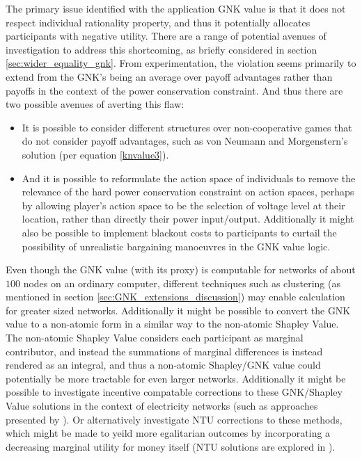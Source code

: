 The primary issue identified with the application GNK value is that it does not respect individual rationality property, and thus it potentially allocates participants with negative utility. There are a range of potential avenues of investigation to address this shortcoming, as briefly considered in section \ref{sec:wider_equality_gnk}.
From experimentation, the violation seems primarily to extend from the GNK's being an average over payoff advantages rather than payoffs in the context of the power conservation constraint.
And thus there are two possible avenues of averting this flaw:

\begin{itemize}
\item	It is possible to consider different structures over non-cooperative games that do not consider payoff advantages, such as von Neumann and Morgenstern's solution (per equation \ref{knvalue3}).
\item	And it is possible to reformulate the action space of individuals to remove the relevance of the hard power conservation constraint on action spaces, perhaps by allowing player's action space to be the selection of voltage level at their location, rather than directly their power input/output. Additionally it might also be possible to implement blackout costs to participants to curtail the possibility of unrealistic bargaining manoeuvres in the GNK value logic.
\end{itemize}


Even though the GNK value (with its proxy) is computable for networks of about $100$ nodes on an ordinary computer, different techniques such as clustering (as mentioned in section \ref{sec:GNK_extensions_discussion}) may enable calculation for greater sized networks.
Additionally it might be possible to convert the GNK value to a non-atomic form in a similar way to the non-atomic Shapley Value.
The non-atomic Shapley Value considers each participant as marginal contributor, and instead the summations of marginal differences is instead rendered as an integral, and thus a non-atomic Shapley/GNK value could potentially be more tractable for even larger networks.
Additionally it might be possible to investigate incentive compatable corrections to these GNK/Shapley Value solutions in the context of electricity networks (such as approaches presented by \cite{myerson1,Salamanca2019}).
Or alternatively investigate NTU corrections to these methods, which might be made to yeild more egalitarian outcomes by incorporating a decreasing marginal utility for money itself (NTU solutions are explored in \cite{value1}).

